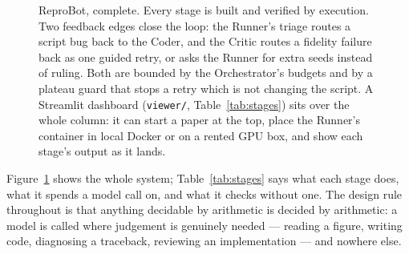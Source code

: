 \documentclass[10pt,twocolumn]{article}
\begin{document}
\begin{figure}[tbp]
\caption{ReproBot, complete. Every stage is built and verified by execution. Two feedback edges
close the loop: the Runner's triage routes a script bug back to the Coder, and the Critic routes a
fidelity failure back as one guided retry, or asks the Runner for extra seeds instead of ruling.
Both are bounded by the Orchestrator's budgets and by a plateau guard that stops a retry which is
not changing the script. A Streamlit dashboard (\texttt{viewer/}, Table~\ref{tab:stages}) sits
over the whole column: it can start a paper at the top, place the Runner's container in local
Docker or on a rented GPU box, and show each stage's output as it lands.}
\label{fig:pipeline}
\end{figure}


Figure~\ref{fig:pipeline} shows the whole system; Table~\ref{tab:stages} says what each stage
does, what it spends a model call on, and what it checks without one. The design rule throughout
is that anything decidable by arithmetic is decided by arithmetic: a model is called where
judgement is genuinely needed --- reading a figure, writing code, diagnosing a traceback,
reviewing an implementation --- and nowhere else.
\end{document}
